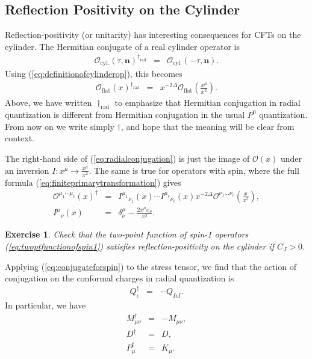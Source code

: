 \documentclass{ws-rv9x6}
\newcommand\be{\begin{eqnarray}}
\newcommand\ee{\end{eqnarray}}
\newcommand\cO{\mathcal{O}}
\newcommand\p[1]{\left(#1\right)}
\newcommand\e\epsilon
\newcommand\<\langle
\renewcommand\>\rangle
\newcommand\de\delta
\newcommand\nn{\nonumber}
\renewcommand\.{\cdot}
\newcommand\De{\Delta}
\newcommand\bn{\mathbf{n}}
\newtheorem{exercise}{Exercise}[section]
\begin{document}
\subsection{Reflection Positivity on the Cylinder}

Reflection-positivity (or unitarity) has interesting consequences for CFTs on the cylinder.  The Hermitian conjugate of a real cylinder operator is
\be
\cO_\mathrm{cyl.}(\tau,\bn)^{\dag_\mathrm{rad}} &=& \cO_\mathrm{cyl.}(-\tau,\bn).
\ee
Using (\ref{eq:definitionofcylinderop}), this becomes
\be
\cO_\mathrm{flat}(x)^{\dag_\mathrm{rad}} &=& x^{-2\De}\cO_\mathrm{flat}\p{\frac{x^\mu}{x^2}}.\label{eq:radialconjugation}
\ee
Above, we have written $\dag_\mathrm{rad}$ to emphasize that Hermitian conjugation in radial quantization is different from Hermitian conjugation in the usual $P^0$ quantization.  From now on we write simply $\dag$, and hope that the meaning will be clear from context.

The right-hand side of (\ref{eq:radialconjugation}) is just the image of $\cO(x)$ under an inversion $I:x^\mu\to \frac{x^\mu}{x^2}$.  The same is true for operators with spin, where the full formula (\ref{eq:finiteprimarytransformation}) gives
\be
\label{eq:conjugateforspin}
\cO^{\mu_1\cdots\mu_\ell}(x)^\dag &=& I^{\mu_1}{}_{\nu_1}(x)\cdots I^{\mu_\ell}{}_{\nu_\ell}(x) x^{-2\De} \cO^{\nu_1\dots\nu_\ell}\p{\frac{x}{x^2}},\nn\\
I^\mu{}_\nu(x) &=& \de^\mu_\nu - \frac{2 x^\mu x_\nu}{x^2}.
\ee
\begin{exercise}
Check that the two-point function of spin-1 operators (\ref{eq:twoptfunctionofspin1}) satisfies reflection-positivity on the cylinder if $C_J>0$.
\end{exercise}
Applying (\ref{eq:conjugateforspin}) to the stress tensor, we find that 
 the action of conjugation on the conformal charges in radial quantization is
\be
Q_\e^\dag &=& -Q_{I\e I}.
\ee
In particular, we have
\be
\label{eq:mantihermitian}
M_{\mu\nu}^\dag &=& -M_{\mu\nu},\nn\\
D^\dag &=& D,\nn\\
P_\mu^\dag &=& K_\mu.
\ee
\end{document}
